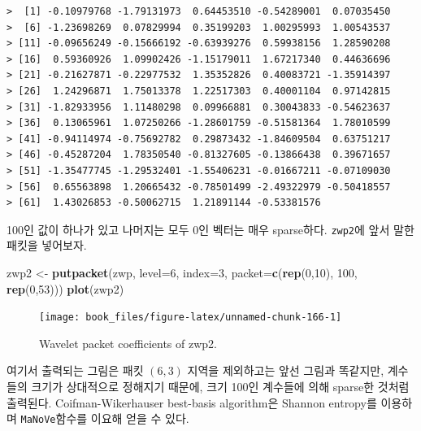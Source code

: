 \documentclass[b5paper,]{book}
\makeatletter
\newenvironment{Shaded}{\begin{snugshade}}{\end{snugshade}}
\newcommand{\KeywordTok}[1]{\textcolor[rgb]{0.13,0.29,0.53}{\textbf{{#1}}}}
\newcommand{\DataTypeTok}[1]{\textcolor[rgb]{0.13,0.29,0.53}{{#1}}}
\newcommand{\DecValTok}[1]{\textcolor[rgb]{0.00,0.00,0.81}{{#1}}}
\newcommand{\StringTok}[1]{\textcolor[rgb]{0.31,0.60,0.02}{{#1}}}
\newcommand{\NormalTok}[1]{{#1}}
\newenvironment{kframe}{%
\medskip{}
\setlength{\fboxsep}{.8em}
 \def\at@end@of@kframe{}%
 \ifinner\ifhmode%
  \def\at@end@of@kframe{\end{minipage}}%
  \begin{minipage}{\columnwidth}%
 \fi\fi%
 \def\FrameCommand##1{\hskip\@totalleftmargin \hskip-\fboxsep
 \colorbox{shadecolor}{##1}\hskip-\fboxsep
     \hskip-\linewidth \hskip-\@totalleftmargin \hskip\columnwidth}%
 \MakeFramed {\advance\hsize-\width
   \@totalleftmargin\z@ \linewidth\hsize
   \@setminipage}}%
 {\par\unskip\endMakeFramed%
 \at@end@of@kframe}
\renewenvironment{Shaded}{\begin{kframe}}{\end{kframe}}
\theoremstyle{definition}
\theoremstyle{definition}
\theoremstyle{definition}
\theoremstyle{remark}
\makeatother
\begin{document}
\begin{verbatim}
>  [1] -0.10979768 -1.79131973  0.64453510 -0.54289001  0.07035450
>  [6] -1.23698269  0.07829994  0.35199203  1.00295993  1.00543537
> [11] -0.09656249 -0.15666192 -0.63939276  0.59938156  1.28590208
> [16]  0.59360926  1.09902426 -1.15179011  1.67217340  0.44636696
> [21] -0.21627871 -0.22977532  1.35352826  0.40083721 -1.35914397
> [26]  1.24296871  1.75013378  1.22517303  0.40001104  0.97142815
> [31] -1.82933956  1.11480298  0.09966881  0.30043833 -0.54623637
> [36]  0.13065961  1.07250266 -1.28601759 -0.51581364  1.78010599
> [41] -0.94114974 -0.75692782  0.29873432 -1.84609504  0.63751217
> [46] -0.45287204  1.78350540 -0.81327605 -0.13866438  0.39671657
> [51] -1.35477745 -1.29532401 -1.55406231 -0.01667211 -0.07109030
> [56]  0.65563898  1.20665432 -0.78501499 -2.49322979 -0.50418557
> [61]  1.43026853 -0.50062715  1.21891144 -0.53381576
\end{verbatim}

100인 값이 하나가 있고 나머지는 모두 0인 벡터는 매우 sparse하다.
\texttt{zwp2}에 앞서 말한 패킷을 넣어보자.

\begin{Shaded}
\begin{Highlighting}[]
\NormalTok{zwp2 <-}\StringTok{ }\KeywordTok{putpacket}\NormalTok{(zwp, }\DataTypeTok{level=}\DecValTok{6}\NormalTok{, }\DataTypeTok{index=}\DecValTok{3}\NormalTok{, }\DataTypeTok{packet=}\KeywordTok{c}\NormalTok{(}\KeywordTok{rep}\NormalTok{(}\DecValTok{0}\NormalTok{,}\DecValTok{10}\NormalTok{), }\DecValTok{100}\NormalTok{, }\KeywordTok{rep}\NormalTok{(}\DecValTok{0}\NormalTok{,}\DecValTok{53}\NormalTok{)))}
\KeywordTok{plot}\NormalTok{(zwp2)}
\end{Highlighting}
\end{Shaded}

\begin{figure}

{\centering \texttt{[image: book\_files/figure-latex/unnamed-chunk-166-1]} 

}

\caption{Wavelet packet coefficients of zwp2.}\label{fig:unnamed-chunk-166}
\end{figure}

여기서 출력되는 그림은 패킷 \((6,3)\) 지역을 제외하고는 앞선 그림과
똑같지만, 계수들의 크기가 상대적으로 정해지기 때문에, 크기 100인
계수들에 의해 sparse한 것처럼 출력된다. Coifman-Wikerhauser best-basis
algorithm은 Shannon entropy를 이용하며 \texttt{MaNoVe}함수를 이요해 얻을
수 있다.
\end{document}
